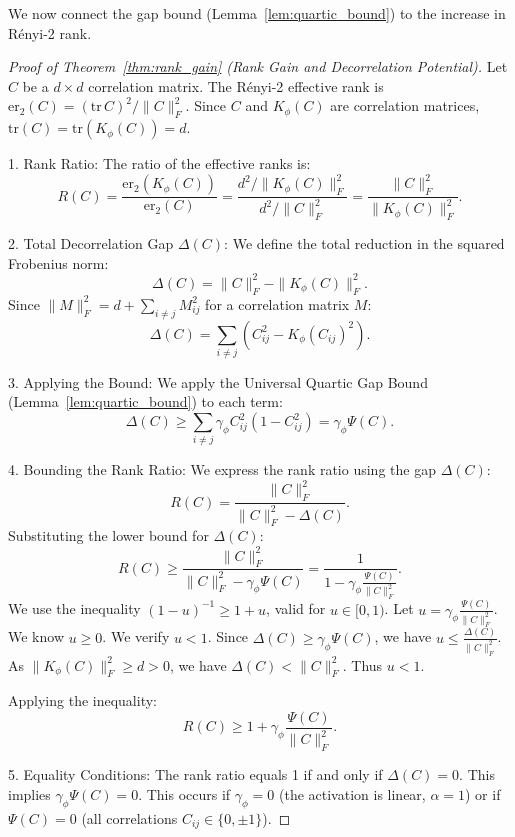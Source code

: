 \documentclass{article}
\numberwithin{figure}{section}
\begin{document}
We now connect the gap bound (Lemma~\ref{lem:quartic_bound}) to the increase in Rényi-2 rank.

\begin{proof}[Proof of Theorem~\ref{thm:rank_gain} (Rank Gain and Decorrelation Potential)]
Let $C$ be a $d\times d$ correlation matrix. The Rényi-2 effective rank is $\mathrm{er}_2(C) = (\text{tr}\,C)^2 / \|C\|_F^2$. Since $C$ and $K_\phi(C)$ are correlation matrices, $\text{tr}(C)=\text{tr}(K_\phi(C))=d$.

1.  Rank Ratio:
    The ratio of the effective ranks is:
    \[
    R(C) = \frac{\mathrm{er}_2(K_\phi(C))}{\mathrm{er}_2(C)} = \frac{d^2/\|K_\phi(C)\|_F^2}{d^2/\|C\|_F^2} = \frac{\|C\|_F^2}{\|K_\phi(C)\|_F^2}.
    \]

2.  Total Decorrelation Gap $\Delta(C)$:
    We define the total reduction in the squared Frobenius norm:
    \[
    \Delta(C) = \|C\|_F^2 - \|K_\phi(C)\|_F^2.
    \]
    Since $\|M\|_F^2 = d + \sum_{i\ne j} M_{ij}^2$ for a correlation matrix $M$:
    \[
    \Delta(C) = \sum_{i \ne j} (C_{ij}^2 - K_\phi(C_{ij})^2).
    \]

3.  Applying the Bound:
    We apply the Universal Quartic Gap Bound (Lemma~\ref{lem:quartic_bound}) to each term:
    \[
    \Delta(C) \ge \sum_{i \ne j} \gamma_\phi C_{ij}^2(1-C_{ij}^2) = \gamma_\phi \Psi(C).
    \]

4.  Bounding the Rank Ratio:
    We express the rank ratio using the gap $\Delta(C)$:
    \[
    R(C) = \frac{\|C\|_F^2}{\|C\|_F^2 - \Delta(C)}.
    \]
    Substituting the lower bound for $\Delta(C)$:
    \[
    R(C) \ge \frac{\|C\|_F^2}{\|C\|_F^2 - \gamma_\phi \Psi(C)} = \frac{1}{1 - \gamma_\phi \frac{\Psi(C)}{\|C\|_F^2}}.
    \]
    We use the inequality $(1-u)^{-1} \ge 1+u$, valid for $u \in [0,1)$.
    Let $u = \gamma_\phi \frac{\Psi(C)}{\|C\|_F^2}$. We know $u \ge 0$. We verify $u < 1$. Since $\Delta(C) \ge \gamma_\phi \Psi(C)$, we have $u \le \frac{\Delta(C)}{\|C\|_F^2}$. As $\|K_\phi(C)\|_F^2 \ge d > 0$, we have $\Delta(C) < \|C\|_F^2$. Thus $u < 1$.

    Applying the inequality:
    \[
    R(C) \ge 1 + \gamma_\phi \frac{\Psi(C)}{\|C\|_F^2}.
    \]

5.  Equality Conditions:
    The rank ratio equals 1 if and only if $\Delta(C)=0$. This implies $\gamma_\phi \Psi(C)=0$. This occurs if $\gamma_\phi=0$ (the activation is linear, $\alpha=1$) or if $\Psi(C)=0$ (all correlations $C_{ij} \in \{0, \pm 1\}$).
\end{proof}
\end{document}
